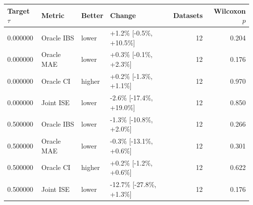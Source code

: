 \begin{tabular}{llllrr}
\toprule
Target $\tau$ & Metric & Better & Change & Datasets & Wilcoxon $p$ \\
\midrule
0.000000 & Oracle IBS & lower & +1.2\% [-0.5\%, +10.5\%] & 12 & 0.204 \\
0.000000 & Oracle MAE & lower & +0.3\% [-0.1\%, +2.3\%] & 12 & 0.176 \\
0.000000 & Oracle CI & higher & +0.2\% [-1.3\%, +1.1\%] & 12 & 0.970 \\
0.000000 & Joint ISE & lower & -2.6\% [-17.4\%, +19.0\%] & 12 & 0.850 \\
0.500000 & Oracle IBS & lower & -1.3\% [-10.8\%, +2.0\%] & 12 & 0.266 \\
0.500000 & Oracle MAE & lower & -0.3\% [-13.1\%, +0.6\%] & 12 & 0.301 \\
0.500000 & Oracle CI & higher & +0.2\% [-1.2\%, +0.6\%] & 12 & 0.622 \\
0.500000 & Joint ISE & lower & -12.7\% [-27.8\%, +1.3\%] & 12 & 0.176 \\
\bottomrule
\end{tabular}
